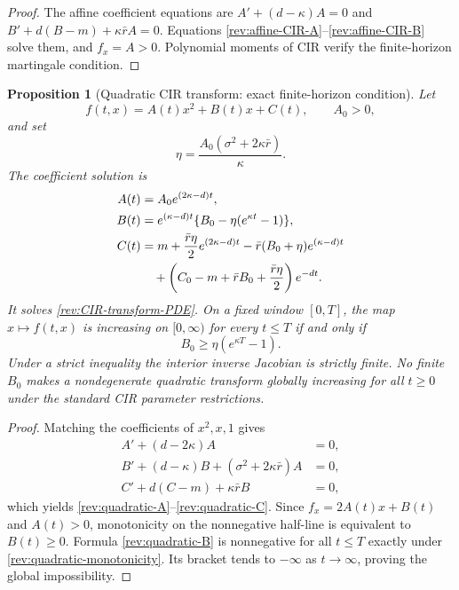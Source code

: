 \documentclass[11pt]{article}
\newtheorem{proposition}[definition]{Proposition}
\theoremstyle{remark}
\begin{document}
\begin{proof}
The affine coefficient equations are
$A'+(d-\kappa)A=0$ and
$B'+d(B-m)+\kappa\bar r A=0$.  Equations
\eqref{rev:affine-CIR-A}--\eqref{rev:affine-CIR-B} solve them, and $f_x=A>0$.
Polynomial moments of CIR verify the finite-horizon martingale condition.
\end{proof}

\begin{proposition}[Quadratic CIR transform: exact finite-horizon condition]
\label{rev:prop-quadratic-CIR}
Let
\begin{equation}
f(t,x)=A(t)x^2+B(t)x+C(t),\qquad A_0>0,
\label{rev:quadratic-CIR-transform}
\end{equation}
and set
\begin{equation}
\eta=\frac{A_0(\sigma^2+2\kappa\bar r)}{\kappa}.
\label{rev:quadratic-eta}
\end{equation}
The coefficient solution is
\begin{align}
A(t)&=A_0e^{(2\kappa-d)t},\label{rev:quadratic-A}\\
B(t)&=e^{(\kappa-d)t}
      \{B_0-\eta(e^{\kappa t}-1)\},\label{rev:quadratic-B}\\
C(t)&=m+\frac{\bar r\eta}{2}e^{(2\kappa-d)t}
-\bar r(B_0+\eta)e^{(\kappa-d)t}
\notag\\
&\quad+
\left(C_0-m+\bar rB_0+\frac{\bar r\eta}{2}\right)e^{-dt}.
\label{rev:quadratic-C}
\end{align}
It solves \eqref{rev:CIR-transform-PDE}.  On a fixed window $[0,T]$, the map
$x\mapsto f(t,x)$ is increasing on $[0,\infty)$ for every $t\le T$ if and only if
\begin{equation}
B_0\ge\eta(e^{\kappa T}-1).
\label{rev:quadratic-monotonicity}
\end{equation}
Under a strict inequality the interior inverse Jacobian is strictly finite.
No finite $B_0$ makes a nondegenerate quadratic transform globally increasing
for all $t\ge0$ under the standard CIR parameter restrictions.
\end{proposition}

\begin{proof}
Matching the coefficients of $x^2,x,1$ gives
\begin{align*}
A'+(d-2\kappa)A&=0,\\
B'+(d-\kappa)B+(\sigma^2+2\kappa\bar r)A&=0,\\
C'+d(C-m)+\kappa\bar r B&=0,
\end{align*}
which yields \eqref{rev:quadratic-A}--\eqref{rev:quadratic-C}.  Since
$f_x=2A(t)x+B(t)$ and $A(t)>0$, monotonicity on the nonnegative half-line is
equivalent to $B(t)\ge0$.  Formula \eqref{rev:quadratic-B} is nonnegative for
all $t\le T$ exactly under \eqref{rev:quadratic-monotonicity}.  Its bracket
tends to $-\infty$ as $t\to\infty$, proving the global impossibility.
\end{proof}
\end{document}
